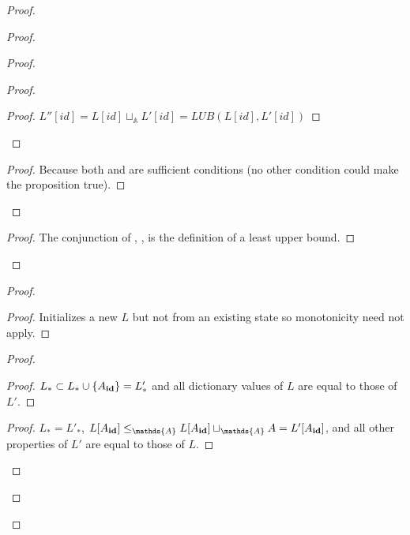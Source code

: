 \documentclass[9pt, oneside]{article}   	%
\begin{document}
\begin{proof}
\begin{proof}
\begin{proof}
\begin{proof}
				\begin{proof}
					$L''[\textit{id}] = L[\textit{id}] \sqcup_\mathds{A} L'[\textit{id}] = \textit{LUB}(L[\textit{id}], L'[\textit{id}])$
				\end{proof}
			\end{proof}
			
			\qedstep
			\begin{proof}
				Because both  and  are sufficient conditions (no other condition could make the proposition true). 
			\end{proof}
		\end{proof}
		
	
		\qedstep
		\begin{proof}
			The conjunction of , ,  is the definition of a least upper bound.
		\end{proof}
	\end{proof}

	\begin{proof}
		\begin{proof}
			Initializes a new $L$ but not from an existing state so monotonicity need not apply.
		\end{proof}
		
		\begin{proof}
			\begin{proof}
				$L_* \subset L_* \cup \{ A_{\scriptsize \textbf{id}} \} = L'_*$ and all dictionary values of $L$ are equal to those of $L'$.
			\end{proof}
			
			\begin{proof}
				$L_* = L'_*$, $L[A_{\scriptsize \textbf{id}}] \leq_\mathds{A} L[A_{\scriptsize \textbf{id}}] \sqcup_\mathds{A} A =  L'[A_{\scriptsize \textbf{id}}]$, and all other properties of $L'$ are equal to those of $L$.
			\end{proof}
		\end{proof}
			

\end{proof}
\end{proof}
\end{document}
